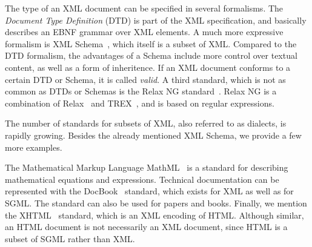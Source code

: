 The type of an XML document can be specified in several formalisms. The {\em Document Type Definition} (DTD) is part of the XML specification, and basically describes an EBNF grammar over XML elements. A much more expressive formalism is XML Schema~\cite{xmlSchema1}, which itself is a subset of XML. Compared to the DTD formalism, the advantages of a Schema include more control over textual content, as well as a form of inheritence. If an XML document conforms to a certain DTD or Schema, it is called {\em valid}. A third standard, which is not as common as DTDs or Schemas is the Relax NG standard~\cite{relaxNG01}. Relax NG is a combination of Relax~\cite{relax01} and TREX~\cite{trex01}, and is based on regular expressions. 



The number of standards for subsets of XML, also referred to as dialects, is rapidly growing. Besides the already mentioned XML Schema, we provide a few more examples.

The Mathematical Markup Language MathML~\cite{mathml20} is a standard for describing mathematical equations and expressions. %
Technical documentation can be represented with the DocBook~\cite{walsh02docbook} standard, which exists for XML as well as for SGML. The standard can also be used for papers and books. Finally, we mention the XHTML~\cite{xhtml11} standard, which is an XML encoding of HTML. Although similar, an HTML document is not necessarily an XML document, since HTML is a subset of SGML rather than XML.





